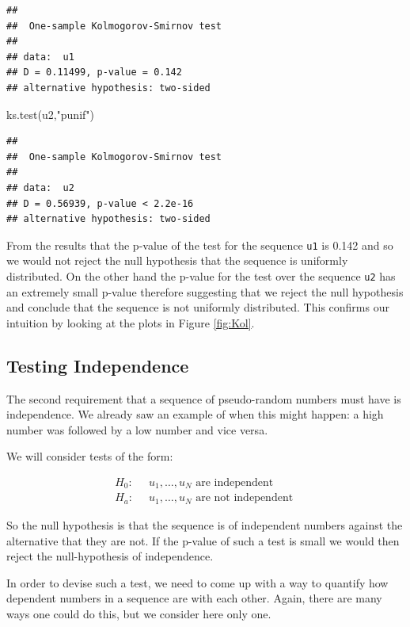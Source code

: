\documentclass[
]{book}
\newenvironment{Shaded}{\begin{snugshade}}{\end{snugshade}}
\newcommand{\FunctionTok}[1]{\textcolor[rgb]{0.00,0.00,0.00}{#1}}
\newcommand{\NormalTok}[1]{#1}
\newcommand{\StringTok}[1]{\textcolor[rgb]{0.31,0.60,0.02}{#1}}
\begin{document}
\begin{verbatim}
## 
##  One-sample Kolmogorov-Smirnov test
## 
## data:  u1
## D = 0.11499, p-value = 0.142
## alternative hypothesis: two-sided
\end{verbatim}

\begin{Shaded}
\begin{Highlighting}[]
\FunctionTok{ks.test}\NormalTok{(u2,}\StringTok{"punif"}\NormalTok{)}
\end{Highlighting}
\end{Shaded}

\begin{verbatim}
## 
##  One-sample Kolmogorov-Smirnov test
## 
## data:  u2
## D = 0.56939, p-value < 2.2e-16
## alternative hypothesis: two-sided
\end{verbatim}

From the results that the p-value of the test for the sequence \texttt{u1} is 0.142 and so we would not reject the null hypothesis that the sequence is uniformly distributed. On the other hand the p-value for the test over the sequence \texttt{u2} has an extremely small p-value therefore suggesting that we reject the null hypothesis and conclude that the sequence is not uniformly distributed. This confirms our intuition by looking at the plots in Figure \ref{fig:Kol}.

\hypertarget{testing-independence}{%
\subsection{Testing Independence}\label{testing-independence}}

The second requirement that a sequence of pseudo-random numbers must have is independence. We already saw an example of when this might happen: a high number was followed by a low number and vice versa.

We will consider tests of the form:

\begin{align*}
H_0: & \;\;u_1,\dots,u_N \mbox{ are independent }\\
H_a: & \;\;u_1,\dots,u_N \mbox{ are not independent }
\end{align*}

So the null hypothesis is that the sequence is of independent numbers against the alternative that they are not. If the p-value of such a test is small we would then reject the null-hypothesis of independence.

In order to devise such a test, we need to come up with a way to quantify how dependent numbers in a sequence are with each other. Again, there are many ways one could do this, but we consider here only one.
\end{document}
